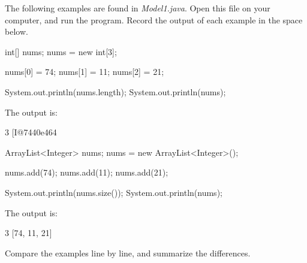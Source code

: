 
The following examples are found in \textit{Model1.java}.
Open this file on your computer, and run the program.
Record the output of each example in the space below.

\begin{multicols}{2}

\begin{javanum}
int[] nums;
nums = new int[3];

nums[0] = 74;
nums[1] = 11;
nums[2] = 21;

System.out.println(nums.length);
System.out.println(nums);
\end{javanum}

\vspace{1em}
The output is:

\begin{answer}[3em]
\begin{javaans}
3
[I@7440e464
\end{javaans}
\end{answer}

\columnbreak

\begin{javanum}
ArrayList<Integer> nums;
nums = new ArrayList<Integer>();

nums.add(74);
nums.add(11);
nums.add(21);

System.out.println(nums.size());
System.out.println(nums);
\end{javanum}

\vspace{1em}
The output is:

\begin{answer}[3em]
\begin{javaans}
3
[74, 11, 21]
\end{javaans}
\end{answer}

\end{multicols}




\Q Compare the examples line by line, and summarize the differences.

